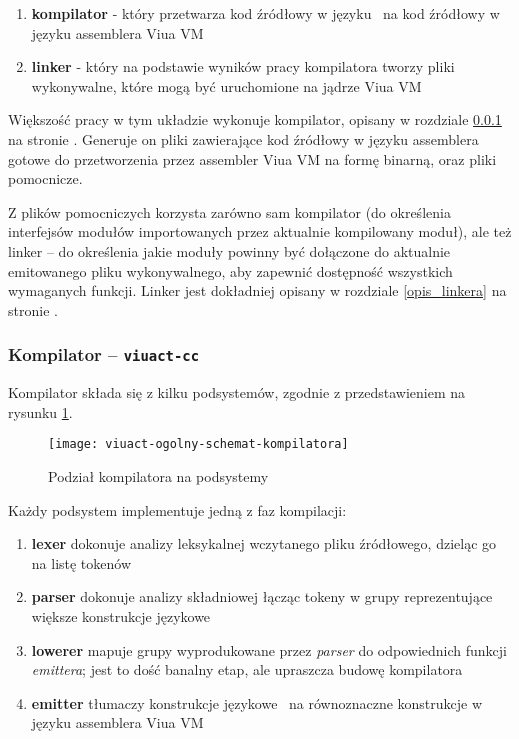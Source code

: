 \begin{enumerate}
    \item \textbf{kompilator} - który przetwarza kod źródłowy w języku \ViuAct\ na kod źródłowy w języku
        assemblera Viua VM
    \item \textbf{linker} - który na podstawie wyników pracy kompilatora tworzy pliki wykonywalne, które
        mogą być uruchomione na jądrze Viua VM
\end{enumerate}

Większość pracy w tym układzie wykonuje kompilator, opisany w rozdziale \ref{opis_kompilatora} na stronie
\pageref{opis_kompilatora}. Generuje on pliki zawierające kod źródłowy w języku assemblera gotowe do
przetworzenia przez assembler Viua VM na formę binarną, oraz pliki pomocnicze.

Z plików pomocniczych korzysta zarówno sam kompilator (do określenia interfejsów modułów importowanych przez
aktualnie kompilowany moduł), ale też linker -- do określenia jakie moduły powinny być dołączone do aktualnie
emitowanego pliku wykonywalnego, aby zapewnić dostępność wszystkich wymaganych funkcji. Linker jest dokładniej
opisany w rozdziale \ref{opis_linkera} na stronie \pageref{opis_linkera}.

\subsubsection{Kompilator -- \texttt{viuact-cc}}
\label{opis_kompilatora}

Kompilator składa się z kilku podsystemów, zgodnie z
przedstawieniem na rysunku \ref{ogolny_schemat_kompilatora_viuact}.

\begin{figure}[!htp]
    \centering
    \texttt{[image: viuact-ogolny-schemat-kompilatora]}
    \caption{Podział kompilatora na podsystemy}
    \label{ogolny_schemat_kompilatora_viuact}
\end{figure}

Każdy podsystem implementuje jedną z faz kompilacji:

\begin{enumerate}
    \item \textbf{lexer} dokonuje analizy leksykalnej wczytanego pliku źródłowego, dzieląc go na listę tokenów
    \item \textbf{parser} dokonuje analizy składniowej łącząc tokeny w grupy reprezentujące większe
        konstrukcje językowe
    \item \textbf{lowerer} mapuje grupy wyprodukowane przez \emph{parser} do odpowiednich funkcji
        \emph{emittera}; jest to dość banalny etap, ale upraszcza budowę kompilatora
    \item \textbf{emitter} tłumaczy konstrukcje językowe \ViuAct\ na równoznaczne konstrukcje w języku
        assemblera Viua VM
\end{enumerate}

